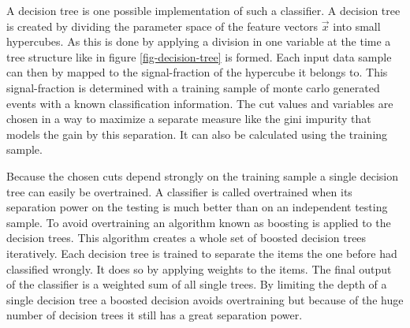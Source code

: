 A decision tree is one possible implementation of such a classifier. A decision tree is created by dividing the parameter space of the feature vectors $\vec x$ into small hypercubes. As this is done by applying a division in one variable at the time a tree structure like in figure \ref{fig-decision-tree} is formed. Each input data sample can then by mapped to the signal-fraction of the hypercube it belongs to. This signal-fraction is determined with a training sample of monte carlo generated events with a known classification information. The cut values and variables are chosen in a way to maximize a separate measure like the gini impurity that models the gain by this separation. It can also be calculated using the training sample. 

Because the chosen cuts depend strongly on the training sample a single decision tree can easily be overtrained. A classifier is called overtrained when its separation power on the testing is much better than on an independent testing sample. To avoid overtraining an algorithm known as boosting is applied to the decision trees. This algorithm creates a whole set of boosted decision trees iteratively. Each decision tree is trained to separate the items the one before had classified wrongly. It does so by applying weights to the items. The final output of the classifier is a weighted sum of all single trees. By limiting the depth of a single decision tree a boosted decision avoids overtraining but because of the huge number of decision trees it still has a great separation power.

